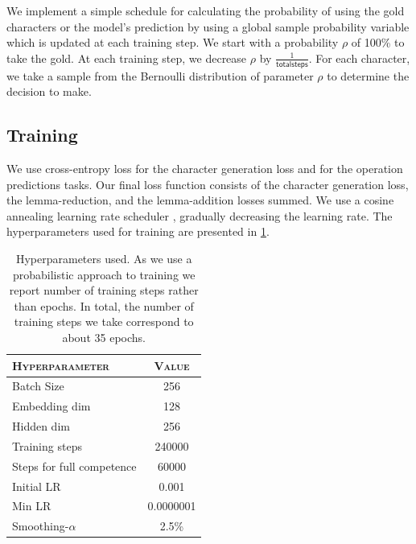 \documentclass[11pt,a4paper]{article}
\begin{document}
We implement a simple schedule for calculating the probability of
using the gold characters or the model's prediction by using a global
sample probability variable which is updated at each training step. We
start with a probability \(\rho\) of 100\% to take the gold. At each
training step, we decrease \(\rho\) by
$\frac{1}{\mathsf{total steps}}$. For each character, we take a sample
from the Bernoulli distribution of parameter \(\rho\) to determine the
decision to make.

\subsection{Training}

We use cross-entropy loss for the character generation loss and for
the operation predictions tasks. Our final loss function consists of
the character generation loss, the lemma-reduction, and the
lemma-addition losses summed. We use a cosine annealing learning rate
scheduler \cite{DBLP:conf/iclr/LoshchilovH17}, gradually decreasing
the learning rate. The hyperparameters used for training are presented
in \cref{tab:hp}.

\begin{table}[ht!]	
\centering
\begin{tabular}{lc}
\textsc{Hyperparameter} & \textsc{Value} \\
  \hline
  Batch Size & 256 \\
  Embedding dim & 128 \\
  Hidden dim & 256 \\
  Training steps & 240000 \\
  Steps for full competence & 60000 \\
  Initial LR & 0.001 \\
  Min LR & 0.0000001 \\
  Smoothing-$\alpha$ & 2.5\%
\end{tabular} 
\caption{Hyperparameters used. As we use a probabilistic approach to
training we report number of training steps rather than epochs. In
total, the number of training steps we take correspond to about 35
epochs.}
\label{tab:hp}
\end{table}
\end{document}
